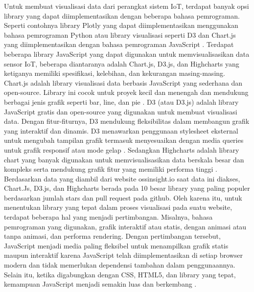 Untuk membuat visualisasi data dari perangkat sistem IoT, terdapat banyak opsi library yang dapat diimplementasikan dengan beberapa bahasa pemrograman. Seperti contohnya library Plotly yang dapat diimplementasikan menggunakan bahasa pemrograman Python \cite{Bostrm2022} atau library visualisasi seperti D3 dan Chart.js yang diimplementasikan dengan bahasa pemrograman JavaScript \cite{Persson2021}. Terdapat beberapa library JavaScript yang dapat digunakan untuk memvisualisasikan data sensor IoT, beberapa diantaranya adalah Chart.js, D3.js, dan Highcharts yang ketiganya memiliki spesifikasi, kelebihan, dan kekurangan masing-masing. Chart.js adalah library visualisasi data berbasis JavaScript yang sederhana dan open-source. Library ini cocok untuk proyek kecil dan menengah dan mendukung berbagai jenis grafik seperti bar, line, dan pie \cite{ChartJs}. D3 (atau D3.js) adalah library JavaScript gratis dan open-source yang digunakan untuk membuat visualisasi data. Dengan fitur-fiturnya, D3 mendukung fleksibilitas dalam membangun grafik yang interaktif dan dinamis. D3 menawarkan penggunaan stylesheet eksternal untuk mengubah tampilan grafik termasuk menyesuaikan dengan media queries untuk grafik responsif atau mode gelap \cite{D3}. Sedangkan Highcharts adalah library chart yang banyak digunakan untuk memvisualisasikan data berskala besar dan kompleks serta mendukung grafik fitur yang memiliki performa tinggi \cite{D3}. Berdasarkan data yang diambil dari website ossinsight.io saat data ini diakses, Chart.Js, D3.js, dan Highcharts berada pada 10 besar library yang paling populer berdasarkan jumlah stars dan pull request pada github\cite{ossinsight}.
Oleh karena itu, untuk menentukan library yang tepat dalam proses visualisasi pada suatu website, terdapat beberapa hal yang menjadi pertimbangan. Misalnya, bahasa pemrograman yang digunakan, grafik interaktif atau statis, dengan animasi atau tanpa animasi, dan performa rendering. Dengan pertimbangan tersebut, JavaScript menjadi media paling fleksibel untuk menampilkan grafik statis maupun interaktif karena JavaScript telah diimplementasikan di setiap browser modern dan tidak memerlukan dependensi tambahan dalam penggunaannya. Selain itu, ketika digabungkan dengan CSS, HTML5, dan library yang tepat, kemampuan JavaScript menjadi semakin luas dan berkembang \cite{Persson2021} \cite{Renear2010}.

